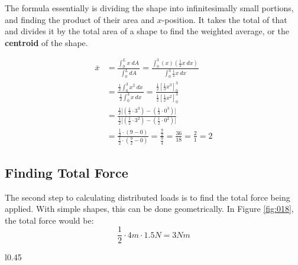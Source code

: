 \documentclass[12pt]{article}
\begin{document}
The formula essentially is dividing the shape into infinitesimally small portions, and finding
the product of their area and $x$-position. It takes the total of that and divides it by
the total area of a shape to find the weighted average, or the \textbf{centroid} of the shape.

\begin{figure}[H]
  \centering
  \begin{subfigure}[H]{0.45\textwidth}
    \centering
    
  \end{subfigure}
  \begin{subfigure}[H]{0.5\textwidth}
    \centering
    \begin{align*}
      \overline{x} &= \frac{\int_{0}^{L} x\ dA \,}{\int_{0}^{L} dA \,} = \frac{\int_{0}^{3} (x)\left(\frac{1}{2}x\ dx\right) \,}{\int_{0}^{3} \frac{1}{2}x\ dx \,} \\
                   &= \frac{\frac{1}{2}\int_{0}^{3} x^2\ dx \,}{\frac{1}{2}\int_{0}^{3}x\ dx \,} = \frac{\frac{1}{2}\left[\frac{1}{3}x^3\right]_{0}^{3}}{\frac{1}{2}\left[\frac{1}{2}x^2\right]_{0}^{3}} \\
                   &= \frac{\frac{1}{2}\big[\left(\frac{1}{3}\cdot3^3\right)-\left(\frac{1}{3}\cdot0^3\right)\big]}{\frac{1}{2}\big[\left(\frac{1}{2}\cdot3^2\right)-\left(\frac{1}{2}\cdot0^2\right)\big]} \\
                   &= \frac{\frac{1}{2}\cdot(9-0)}{\frac{1}{2}\cdot(\frac{9}{2}-0)} = \frac{\frac{9}{2}}{\frac{9}{4}} = \frac{36}{18} = \frac{2}{1} = 2
    \end{align*}
  \end{subfigure}
\end{figure}

\subsection{Finding Total Force}
\label{ssec:findingTotalForce}

The second step to calculating distributed loads is to find the total force being applied.
With simple shapes, this can be done geometrically. In Figure \ref{fig:018}, the total force
would be:
\begin{equation*}
  \frac{1}{2} \cdot 4m \cdot 1.5N = 3Nm
\end{equation*}

\begin{wrapfigure}[10]{l}{0.45\textwidth}
  \centering
  
  \caption{Finding Total Force}
  \label{fig:018}
\end{wrapfigure}
\end{document}

